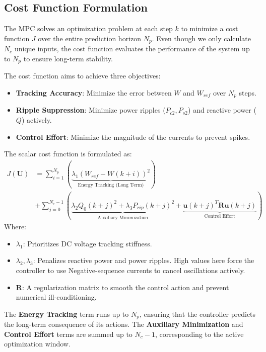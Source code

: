 \subsection{Cost Function Formulation}
The MPC solves an optimization problem at each step $k$ to minimize a cost function $J$ over the entire prediction horizon $N_p$.
Even though we only calculate $N_c$ unique inputs, the cost function evaluates the performance of the system up to $N_p$ to ensure
long-term stability.\par
The cost function aims to achieve three objectives:
\begin{itemize}
    \item \textbf{Tracking Accuracy}: Minimize the error between $W$ and $W_{ref}$ over $N_p$ steps.
    \item \textbf{Ripple Suppression}: Minimize power ripples ($P_{c2}, P_{s2}$) and reactive power ($Q$) actively.
    \item \textbf{Control Effort}: Minimize the magnitude of the currents to prevent spikes.
\end{itemize}
The scalar cost function is formulated as:
\begin{equation}
    \begin{split}
        J(\mathbf{U}) &= \sum_{i=1}^{N_p} \left( \underbrace{\lambda_1 (W_{ref} - W(k+i))^2}_{\text{Energy Tracking (Long Term)}} \right) \\
        &+ \sum_{j=0}^{N_c-1} \left( \underbrace{\lambda_2 Q_0(k+j)^2 + \lambda_{3} P_{rip}(k+j)^2}_{\text{Auxiliary Minimization}}
        + \underbrace{\mathbf{u}(k+j)^T \mathbf{R} \mathbf{u}(k+j)}_{\text{Control Effort}} \right)
    \end{split}
    \label{eq:mpc_cost_function}
\end{equation}
Where:
\begin{itemize}
    \item $\lambda_1$: Prioritizes DC voltage tracking stiffness.
    \item $\lambda_2, \lambda_3$: Penalizes reactive power and power ripples. High values here force the controller to use
          Negative-sequence currents to cancel oscillations actively.
    \item $\mathbf{R}$: A regularization matrix to smooth the control action and prevent numerical ill-conditioning.
\end{itemize}
The \textbf{Energy Tracking} term runs up to $N_p$, ensuring that the controller predicts the long-term consequence of its actions.
The \textbf{Auxiliary Minimization} and \textbf{Control Effort} terms are summed up to $N_c-1$, corresponding to the active optimization window.\par

